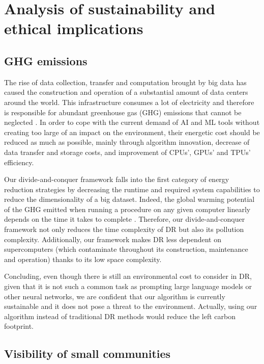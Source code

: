 \section{Analysis of sustainability and ethical implications}

\subsection{GHG emissions}

The rise of data collection, transfer and computation brought by big data has caused the construction and operation of a substantial amount of data centers around the world. This infrastructure consumes a lot of electricity and therefore is responsible for abundant greenhouse gas (GHG) emissions that cannot be neglected \citep{IEA2025, Brierley2023}. In order to cope with the current demand of AI and ML tools without creating too large of an impact on the environment, their energetic cost should be reduced as much as possible, mainly through algorithm innovation, decrease of data transfer and storage costs, and improvement of CPUs', GPUs' and TPUs' efficiency.

Our divide-and-conquer framework falls into the first category of energy reduction strategies by decreasing the runtime and required system capabilities to reduce the dimensionality of a big dataset. Indeed, the global warming potential of the GHG emitted when running a procedure on any given computer linearly depends on the time it takes to complete \citep{Lannelongue2021}. Therefore, our divide-and-conquer framework not only reduces the time complexity of DR but also its pollution complexity. Additionally, our framework makes DR less dependent on supercomputers (which contaminate throughout its construction, maintenance and operation) thanks to its low space complexity.

Concluding, even though there is still an environmental cost to consider in DR, given that it is not such a common task as prompting large language models or other neural networks, we are confident that our algorithm is currently sustainable and it does not pose a threat to the environment. Actually, using our algorithm instead of traditional DR methods would reduce the left carbon footprint.

\subsection{Visibility of small communities}

